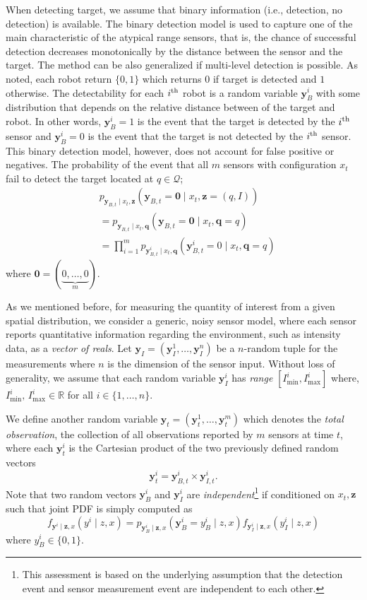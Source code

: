 \documentclass[journal]{IEEEtran}
\begin{document}
When detecting target, we assume that binary information (i.e., detection, no detection) is available. The binary detection model is used to capture one of the main characteristic of the atypical range sensors, that is, the chance of successful detection decreases monotonically by the distance between the sensor and the target.
 The method can be also generalized if multi-level detection is possible.  As noted, each robot return $\lbrace 0,1 \rbrace$ which returns $0$ if target is detected and $1$ otherwise. The detectability for each $i^{\textup{th}}$ robot is a random variable $\bm{y}_B^i$ with some distribution that depends on the relative distance between of the target and robot. In other words, $\bm{y}_{B}^i=1$ is the event that the target is detected by the $i^{\textup{th}}$ sensor and $\bm{y}_{B}^i=0$ is the event that the target is not detected by the $i^{\textup{th}}$ sensor. This binary detection model, however, does not account for false positive or negatives.
The probability of the event that all $m$ sensors with configuration $x_t$ fail to detect the target located at $q \in \mathcal{Q}$;
\begin{align*}
&p_{\bm{y}_{B,t} \mid
	{x}_{t},\bm{z}}\left(
\bm{y}_{B,t} = \bm{0} \mid {x}_{t},
\bm{z}=(q,I)\right) \\
&=p_{\bm{y}_{B,t} \mid
	{x}_{t},\bm{q}}\left(
\bm{y}_{B,t} = \bm{0} \mid {x}_{t},
\bm{q}=q\right) \\
&= \prod_{i=1}^m
p_{\bm{y}_{B,t}^i \mid
	{x}_{t},\bm{q}}\left(
\bm{y}_{B,t}^i = 0 \mid
{x}_{t},\bm{q}=q\right)
\end{align*}
where $\bm{0}= (\underbrace{0,\dots,0}_{m})$.
 
As we mentioned before, for measuring the quantity of interest from a given spatial distribution, we consider a generic, noisy sensor model, where each sensor reports  quantitative information regarding the environment, such as intensity data, as a \emph{vector of reals}. Let $\bm{y}_I= (\bm{y}_I^1,\dots,\bm{y}_I^n)$ be a $n$-random tuple for the measurements where $n$ is the dimension of the sensor input. 
Without loss of generality, we assume that each random variable $\bm{y}_I^i$ has \emph{range} $[I_{\min}^i,I_{\max}^i]$ where, $I_{\min}^i,\,I_{\max}^i \in \mathbb{R}$ for all $i \in \lbrace 1,\dots,n \rbrace$.



We define another random variable $\bm{y}_t=(\bm{y}_t^1,\dots,\bm{y}_t^m)$ 
which denotes the \emph{total observation}, the collection of all observations reported by $m$ sensors at time $t$, where each $\bm{y}_t^i$ is the Cartesian product of the two previously defined random vectors
\[
\bm{y}_t^i = \bm{y}_{B,t}^i \times \bm{y}_{I,t}^i.
\]
Note that two random vectors $\bm{y}_B^i$ and $\bm{y}_I^i$ are \emph{independent}\footnote{This assessment is based on the underlying assumption that the detection event and sensor measurement event are independent to each other.} if conditioned on $x_t,\bm{z}$ such that joint PDF is simply
computed as
\[
f_{\bm{y}^i \mid \bm{z},x}(y^i \mid z,x) = p_{\bm{y}_B^i \mid \bm{z},x}(\bm{y}_B^i=y_B^i \mid z,x)f_{\bm{y}_I^i \mid \bm{z},x}(y_I^i \mid z,x)
\]
where $y_B^i \in \lbrace 0,1 \rbrace$.
\end{document}
